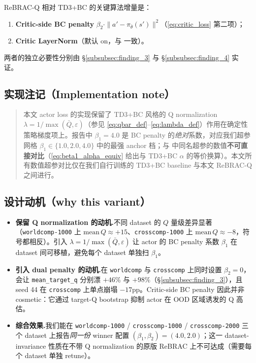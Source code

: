 ReBRAC-Q 相对 TD3+BC 的关键算法增量是：
\begin{enumerate}
    \item \textbf{Critic-side BC penalty} $\beta_2 \cdot \|a' - \pi_{\bar\theta}(s')\|^2$（\eqref{eq:critic_loss} 第二项）；
    \item \textbf{Critic LayerNorm}（默认 on，与 \citet{tarasov2023rebrac} 一致）。
\end{enumerate}
两者的独立必要性分别由 \S\ref{subsubsec:finding_3} 与 \S\ref{subsubsec:finding_4} 实证。

\subsection{实现注记（Implementation note）}
\label{subsec:method_impl_note}

\begin{quote}
本文 actor loss 的实现保留了 TD3+BC 风格的 Q normalization $\lambda = 1/\max(\bar{Q},\varepsilon)$（参见 \eqref{eq:qbar_def}--\eqref{eq:lambda_def}）作用在确定性策略梯度项上。报告中 $\beta_1 = 4.0$ 是 BC penalty 的\emph{绝对}系数，对应我们超参网格 $\beta_1 \in \{1.0, 2.0, 4.0\}$ 中的最强 anchor 档；与 \citet{tarasov2023rebrac} 中同名超参的数值\textbf{不可直接对比}（\eqref{eq:beta1_alpha_equiv} 给出与 TD3+BC $\alpha$ 的等价换算）。本文所有数值超参对比仅在我们自行训练的 TD3+BC baseline 与本文 ReBRAC-Q 之间进行。
\end{quote}

\subsection{设计动机（why this variant）}
\label{subsec:method_why}

\begin{itemize}
    \item \textbf{保留 Q normalization 的动机.}\quad 不同 dataset 的 $Q$ 量级差异显著（\texttt{worldcomp-1000} 上 $\mathrm{mean}\,Q \approx +15$、\texttt{crosscomp-1000} 上 $\mathrm{mean}\,Q \approx -8$，符号都相反）。引入 $\lambda = 1/\max(\bar{Q},\varepsilon)$ 让 actor 的 BC penalty 系数 $\beta_1$ 在 dataset 间可移植，避免每个 dataset 单独扫 $\beta_1$。
    \item \textbf{引入 dual penalty 的动机.}\quad 在 \texttt{worldcomp} 与 \texttt{crosscomp} 上同时设置 $\beta_2 = 0$，会让 \texttt{mean\_target\_q} 分别漂 $+46\%$ 与 $+98\%$（\S\ref{subsubsec:finding_3}），且 seed 44 在 \texttt{crosscomp} 上单点崩塌 $-17$pp。Critic-side BC penalty 因此并非 cosmetic：它通过 target-Q bootstrap 抑制 actor 在 OOD 区域诱发的 Q 高估。
    \item \textbf{综合效果.}\quad 我们能在 \texttt{worldcomp-1000} / \texttt{crosscomp-1000} / \texttt{crosscomp-2000} 三个 dataset 上报告\emph{同一份} winner 配置 $(\beta_1, \beta_2) = (4.0, 2.0)$；这一 dataset-invariance 性质在不带 Q normalization 的原版 ReBRAC 上不可达成（需要每个 dataset 单独 retune）。
\end{itemize}
